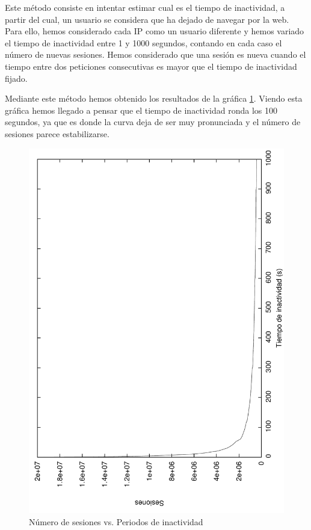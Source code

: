 \documentclass[twocolumn]{Jornadas}
\begin{document}
Este método consiste en intentar estimar cual es el tiempo de inactividad, a partir del cual, un usuario se considera que ha dejado de navegar por la web. Para ello, hemos considerado cada IP como un usuario diferente y hemos variado el tiempo de inactividad entre 1 y 1000 segundos, contando en cada caso el número de nuevas sesiones. Hemos considerado que una sesión es nueva cuando el tiempo entre dos peticiones consecutivas es mayor que el tiempo de inactividad fijado.

Mediante este método hemos obtenido los resultados de la gráfica \ref{fig:numberSessions}. Viendo esta gráfica hemos llegado a pensar que el tiempo de inactividad ronda los 100 segundos, ya que es donde la curva deja de ser muy pronunciada y el número de sesiones parece estabilizarse.

\begin{figure}[]
\begin{center}
  \includegraphics[scale=0.30,angle=-90]{figures/inactivityPeriod_full.pdf}
\end{center}
\caption{Número de sesiones vs. Periodos de inactividad} \label{fig:numberSessions}
\end{figure}
\end{document}

